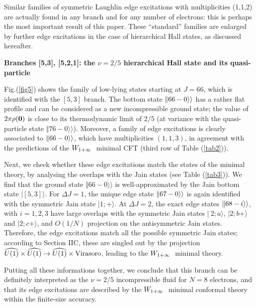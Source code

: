 Similar families of symmetric Laughlin edge excitations with multiplicities 
(1,1,2) are actually found in any branch and for any number of electrons:
this is perhaps the most important result of this paper.
These ``standard'' families are enlarged by further edge
excitations in the case of hierarchical Hall states, as discussed hereafter.

\bigskip

{\bf Branches [5,3], [5,2,1]: the $\nu=2/5$ hierarchical Hall state
and its quasi-particle}

Fig.(\ref{fig5}) shows the family of low-lying states starting at $J=66$, 
which is identified with the $[5,3]$ branch.
The bottom state $\Vert 66-0\rangle\rangle$ has a rather flat profile
and can be considered as a new incompressible ground
state; the value of $2\pi\rho( {\bf 0} )$ is close to its 
thermodynamic limit of $2/5$ (at variance with the quasi-particle state
$\Vert 76-0\rangle\rangle$).
Moreover, a family of edge excitations is clearly associated to
$\Vert 66-0\rangle\rangle$, which have multiplicities $(1,1,3)$,
in agreement with the predictions of the $W_{1+\infty}\ $ minimal CFT 
(third row of Table (\ref{tab2})).

Next, we check whether these edge excitations match the states of the
minimal theory,
by analysing the overlaps with the Jain states (see Table (\ref{tab3})).
We find that the ground state
$\Vert 66-0 \rangle\rangle $ is well-approximated by the Jain bottom 
state $\vert [5,3]\rangle$.
For $\Delta J=1$, the unique edge state $\Vert 67-0 \rangle\rangle$ is again identified
with the symmetric Jain state $\vert 1; +\rangle$.
At $\Delta J =2$, the exact edge states $\Vert 68- i\rangle\rangle$, with $i=1,2,3$ 
have large overlaps with the symmetric Jain states 
$\vert\ 2; a \rangle$, $ \vert 2; b +\rangle$ and $\vert 2;c+\rangle$, 
and $O(1/N)$ projection on the antisymmetric Jain states.
Therefore, the edge excitations match all the possible symmetric
Jain states; 
according to Section IIC, these are singled out by the projection 
$\u1\times\u1 \to \u1\times {\rm Virasoro}$, leading to the $W_{1+\infty}\ $
minimal theory.

Putting all these informations together,
we conclude that this branch can be definitely interpreted as
the $\nu=2/5$ incompressible fluid for $N=8$ electrons, and that its
edge excitations are described by the $W_{1+\infty}\ $ minimal conformal
theory \cite{ctz5} within the finite-size accuracy.

